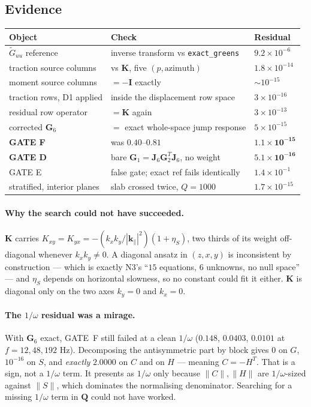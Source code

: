 \documentclass[11pt,a4paper]{article}
\newcommand{\bI}{\mathbf{I}}
\newcommand{\bJ}{\mathbf{J}}
\newcommand{\bQ}{\mathbf{Q}}
\newcommand{\bG}{\mathbf{G}}
\newcommand{\bK}{\mathbf{K}}
\begin{document}
\subsection{Evidence}

\begin{center}
\begin{tabular}{lll}
\toprule
Object & Check & Residual \\
\midrule
$\tilde{G}_{uu}$ reference & inverse transform vs \texttt{exact\_greens} & $9.2\times10^{-6}$ \\
traction source columns & vs $\bK$, five $(p,\text{azimuth})$ & $1.8\times10^{-14}$ \\
moment source columns & $=-\bI$ exactly & $\sim10^{-15}$ \\
traction rows, D1 applied & inside the displacement row space & $3\times10^{-16}$ \\
residual row operator & $=\bK$ again & $3\times10^{-13}$ \\
corrected $\bG_6$ & $=$ exact whole-space jump response & $5\times10^{-15}$ \\
\textbf{GATE F} & was $0.40$--$0.81$ & $\mathbf{1.1\times10^{-15}}$ \\
\textbf{GATE D} & bare $\bG_1 = \bJ_6\bG_2^{T}\bJ_6$, no weight & $\mathbf{5.1\times10^{-16}}$ \\
GATE E & false gate; exact ref fails identically & $1.4\times10^{-1}$ \\
stratified, interior planes & slab crossed twice, $Q=1000$ & $1.7\times10^{-15}$ \\
\bottomrule
\end{tabular}
\end{center}

\paragraph{Why the search could not have succeeded.}  $\bK$ carries
$K_{xy} = K_{yx} = -(k_xk_y/|\mathbf{k}_\parallel|^2)(1+\eta_S)$, two thirds of
its weight off-diagonal whenever $k_xk_y\neq0$.  A diagonal ansatz in
$(z,x,y)$ is inconsistent by construction --- which is exactly N3's ``$15$
equations, $6$ unknowns, no null space'' --- and $\eta_S$ depends on horizontal
slowness, so no constant could fit it either.  $\bK$ is diagonal only on the
two axes $k_y=0$ and $k_x=0$.

\paragraph{The $1/\omega$ residual was a mirage.}  With $\bG_6$ exact, GATE~F
still failed at a clean $1/\omega$ ($0.148$, $0.0403$, $0.0101$ at $f=12,48,192$
Hz).  Decomposing the antisymmetric part by block gives $0$ on $G$, $10^{-16}$
on $S$, and \emph{exactly} $2.0000$ on $C$ and on $H$ --- meaning $C = -H^{T}$.
That is a sign, not a $1/\omega$ term.  It presents as $1/\omega$ only because
$\|C\|,\|H\|$ are $1/\omega$-sized against $\|S\|$, which dominates the
normalising denominator.  Searching for a missing $1/\omega$ term in $\bQ$ could
not have worked.
\end{document}
